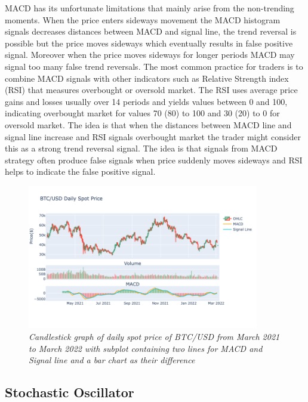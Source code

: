 MACD has its unfortunate limitations that mainly arise from the non-trending moments. When the price enters sideways movement the MACD histogram signals decreases distances between MACD and signal line, the trend reversal is possible but the price moves sideways which eventually results in false positive signal. Moreover when the price moves sideways for longer periods MACD may signal too many false trend reversals. The most common practice for traders is to combine MACD signals with other indicators such as Relative Strength index (RSI) that measures overbought or oversold market. The RSI uses average price gains and losses usually over 14 periods and yields values between 0 and 100, indicating overbought market for values 70 (80) to 100 and 30 (20) to 0 for oversold market. The idea is that when the distances between MACD line and signal line increase and RSI signals overbought market the trader might consider this as a strong trend reversal signal. The idea is that signals from MACD strategy often produce false signals when price suddenly moves sideways and RSI helps to indicate the false positive signal. 

\begin{figure}[ht]

\begin{center}
	\includegraphics[width=0.9\textwidth]{Figs/MACD.png}
\end{center}

\caption{\textit{ Candlestick graph of daily spot price of BTC/USD from March 2021 to March 2022 with subplot containing two lines for MACD and Signal line and a bar chart as their difference}}

\end{figure}

\subsection{Stochastic Oscillator}

